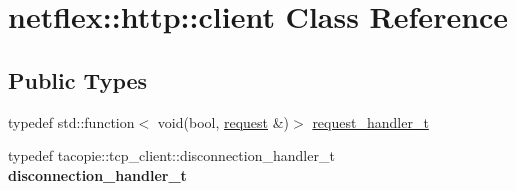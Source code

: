 \hypertarget{classnetflex_1_1http_1_1client}{}\section{netflex\+:\+:http\+:\+:client Class Reference}
\label{classnetflex_1_1http_1_1client}
\subsection*{Public Types}
\begin{DoxyCompactItemize}
\item 
typedef std\+::function$<$ void(bool, \hyperlink{classnetflex_1_1http_1_1request}{request} \&)$>$ \hyperlink{classnetflex_1_1http_1_1client_aeac22a78222d25d3224bf50b8e44fb2d}{request\+\_\+handler\+\_\+t}
\item 
\mbox{\label{classnetflex_1_1http_1_1client_acacb8798dcade63c52a674b3f7820fba}} 
typedef tacopie\+::tcp\+\_\+client\+::disconnection\+\_\+handler\+\_\+t {\bfseries disconnection\+\_\+handler\+\_\+t}
\end{DoxyCompactItemize}
